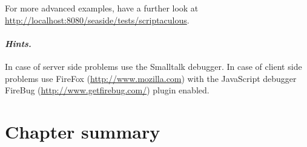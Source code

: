 \documentclass[a4paper,10pt,twoside]{book}
\begin{document}
For more advanced examples, have a further look at
\url{http://localhost:8080/seaside/tests/scriptaculous}.

\paragraph{\emph{Hints.}}
In case of server side problems use the Smalltalk debugger.
In case of client side problems use FireFox (\url{http://www.mozilla.com}) with the
JavaScript debugger FireBug (\url{http://www.getfirebug.com/}) plugin enabled.

\section{Chapter summary}
\end{document}
